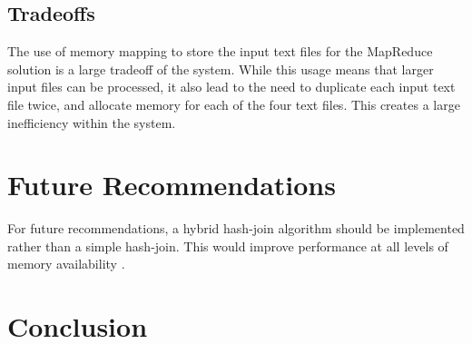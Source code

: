 \documentclass[10pt,twocolumn]{witseiepaper}
\begin{document}
\subsection{Tradeoffs} \label{sec:tradeoffs}
The use of memory mapping to store the input text files for the MapReduce solution is a large tradeoff of the system. While this usage means that larger input files can be processed, it also lead to the need to duplicate each input text file twice, and allocate memory for each of the four text files. This creates a large inefficiency within the system.

\section{Future Recommendations}
For future recommendations, a hybrid hash-join algorithm should be implemented rather than a simple hash-join. This would improve performance at all levels of memory availability \cite{evaluating4JoinAlgorithms}.

\section{Conclusion}



\end{document}
